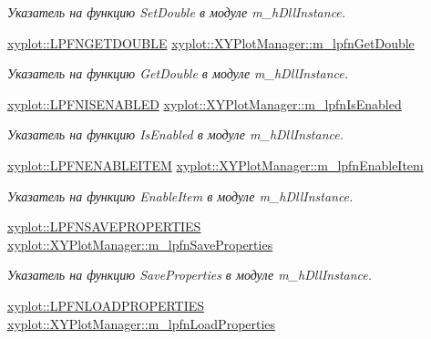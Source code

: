 \begin{DoxyCompactItemize}
\begin{DoxyCompactList}\small\item\em Указатель на функцию Set\-Double в модуле m\-\_\-h\-Dll\-Instance. \end{DoxyCompactList}\item 
\hyperlink{namespacexyplot_ada339f0f5dd59a8edbeb5462b404b412}{xyplot\-::\-L\-P\-F\-N\-G\-E\-T\-D\-O\-U\-B\-L\-E} \hyperlink{group__gr_func_pointers_gac1a94a046cfcf628aa6692941a206adc}{xyplot\-::\-X\-Y\-Plot\-Manager\-::m\-\_\-lpfn\-Get\-Double}
\begin{DoxyCompactList}\small\item\em Указатель на функцию Get\-Double в модуле m\-\_\-h\-Dll\-Instance. \end{DoxyCompactList}\item 
\hyperlink{namespacexyplot_a2b24ec8edd78c631d7576e9e0804bd3b}{xyplot\-::\-L\-P\-F\-N\-I\-S\-E\-N\-A\-B\-L\-E\-D} \hyperlink{group__gr_func_pointers_ga2fdbebbf63a4c3cd16bbf660614f18c0}{xyplot\-::\-X\-Y\-Plot\-Manager\-::m\-\_\-lpfn\-Is\-Enabled}
\begin{DoxyCompactList}\small\item\em Указатель на функцию Is\-Enabled в модуле m\-\_\-h\-Dll\-Instance. \end{DoxyCompactList}\item 
\hyperlink{namespacexyplot_adc713064c472b328718bae52d4a28eb5}{xyplot\-::\-L\-P\-F\-N\-E\-N\-A\-B\-L\-E\-I\-T\-E\-M} \hyperlink{group__gr_func_pointers_ga421533a2bc619d310d3d15ea0e711e2e}{xyplot\-::\-X\-Y\-Plot\-Manager\-::m\-\_\-lpfn\-Enable\-Item}
\begin{DoxyCompactList}\small\item\em Указатель на функцию Enable\-Item в модуле m\-\_\-h\-Dll\-Instance. \end{DoxyCompactList}\item 
\hyperlink{namespacexyplot_a097f19903e90904e363a37bd0418d16b}{xyplot\-::\-L\-P\-F\-N\-S\-A\-V\-E\-P\-R\-O\-P\-E\-R\-T\-I\-E\-S} \hyperlink{group__gr_func_pointers_ga74b37df4630a8a23c0751467389449c7}{xyplot\-::\-X\-Y\-Plot\-Manager\-::m\-\_\-lpfn\-Save\-Properties}
\begin{DoxyCompactList}\small\item\em Указатель на функцию Save\-Properties в модуле m\-\_\-h\-Dll\-Instance. \end{DoxyCompactList}\item 
\hyperlink{namespacexyplot_a5fcef3c2ef35e0f543cb6e0489566a41}{xyplot\-::\-L\-P\-F\-N\-L\-O\-A\-D\-P\-R\-O\-P\-E\-R\-T\-I\-E\-S} \hyperlink{group__gr_func_pointers_ga13af71d79b02970b7d7c78d148b7fb3e}{xyplot\-::\-X\-Y\-Plot\-Manager\-::m\-\_\-lpfn\-Load\-Properties}

\end{DoxyCompactItemize}
